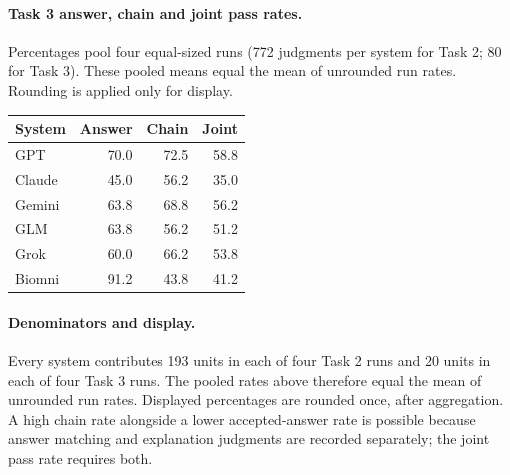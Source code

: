 \paragraph{Task 3 answer, chain and joint pass rates.} Percentages pool four equal-sized runs (772 judgments per system for Task 2; 80 for Task 3). These pooled means equal the mean of unrounded run rates. Rounding is applied only for display.
\begin{center}
\begin{tabular}{lrrr}
\toprule
System & Answer & Chain & Joint \\
\midrule
GPT & 70.0 & 72.5 & 58.8 \\
Claude & 45.0 & 56.2 & 35.0 \\
Gemini & 63.8 & 68.8 & 56.2 \\
GLM & 63.8 & 56.2 & 51.2 \\
Grok & 60.0 & 66.2 & 53.8 \\
Biomni & 91.2 & 43.8 & 41.2 \\
\bottomrule
\end{tabular}
\end{center}
\paragraph{Denominators and display.} Every system contributes 193 units in each of four Task 2 runs and 20 units in each of four Task 3 runs. The pooled rates above therefore equal the mean of unrounded run rates. Displayed percentages are rounded once, after aggregation. A high chain rate alongside a lower accepted-answer rate is possible because answer matching and explanation judgments are recorded separately; the joint pass rate requires both.

\clearpage

